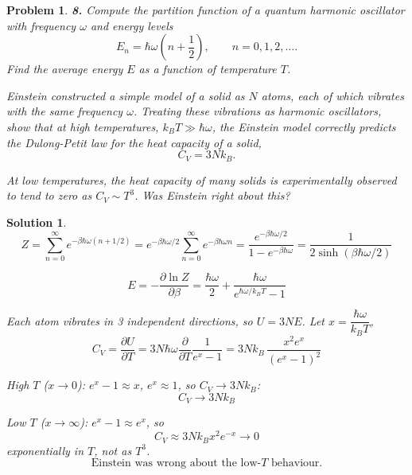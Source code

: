 \documentclass[11pt]{article}
\newtheorem*{problem}{Problem}
\newtheorem*{solution}{Solution}
\begin{document}
\begin{problem}
\textbf{8.} Compute the partition function of a quantum harmonic oscillator with frequency
$\omega$ and energy levels
\[
E_n=\hbar\omega\left(n+\frac12\right),\qquad n=0,1,2,\dots.
\]
Find the average energy $E$ as a function of temperature $T$.

Einstein constructed a simple model of a solid as $N$ atoms, each of which vibrates with the
same frequency $\omega$. Treating these vibrations as harmonic oscillators, show that at high
temperatures, $k_BT\gg\hbar\omega$, the Einstein model correctly predicts the \textit{Dulong-Petit}
law for the heat capacity of a solid,
\[
C_V=3Nk_B.
\]

At low temperatures, the heat capacity of many solids is experimentally observed to tend to
zero as $C_V\sim T^3$. Was Einstein right about this?
\end{problem}

\begin{solution}
\[
Z=\sum_{n=0}^\infty e^{-\beta\hbar\omega(n+1/2)}
=e^{-\beta\hbar\omega/2}\sum_{n=0}^\infty e^{-\beta\hbar\omega n}
=\frac{e^{-\beta\hbar\omega/2}}{1-e^{-\beta\hbar\omega}}
=\boxed{\frac{1}{2\sinh(\beta\hbar\omega/2)}}
\]

\[
E=-\frac{\partial\ln Z}{\partial\beta}
=\boxed{\frac{\hbar\omega}{2}+\frac{\hbar\omega}{e^{\hbar\omega/k_BT}-1}}
\]

Each atom vibrates in 3 independent directions, so $U=3NE$. Let $x=\dfrac{\hbar\omega}{k_BT}$,
\[
C_V=\frac{\partial U}{\partial T}=3N\hbar\omega\frac{\partial}{\partial T}\frac{1}{e^x-1}
=\boxed{3Nk_B\,\frac{x^2e^x}{(e^x-1)^2}}
\]

High $T$ ($x\to0$): $e^x-1\approx x$, $e^x\approx1$, so $C_V\to3Nk_B$:
\[
\boxed{C_V\to3Nk_B}
\]

Low $T$ ($x\to\infty$): $e^x-1\approx e^x$, so
\[
C_V\approx3Nk_Bx^2e^{-x}\to0
\]
exponentially in $T$, not as $T^3$.
\[
\boxed{\text{Einstein was wrong about the low-}T\text{ behaviour.}}
\]
\end{solution}
\end{document}
